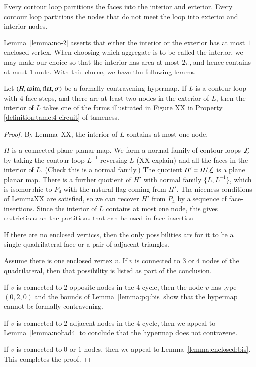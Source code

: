 Every contour loop partitions the faces into the interior and
exterior.  Every contour loop partitions the nodes that do not meet
the loop into exterior and interior nodes.
%

Lemma~\ref{lemma:no-2} asserts that either the interior or the
exterior has at most $1$ enclosed vertex.   When choosing which
aggregate is to be called the interior, we may make our choice so
that the interior has area at most $2\pi$, and hence contains at
most $1$ node. With this choice, we have the following lemma.

\begin{lemma}
Let $(H,{\operatorname{azim}},\operatorname{flat},\sigma)$ be a formally contravening hypermap. If
$L$ is a contour loop with $4$ face steps, and there are at least
two nodes in the exterior of $L$, then the interior of $L$ takes one
of the forms illustrated in Figure XX in Property
    \ref{definition:tame:4-circuit} of tameness.
\end{lemma}

\begin{proof}
By Lemma~XX, the interior of $L$ contains at most one node.

$H$ is a connected plane planar map.  We form a normal family of
contour loops ${\cal L}$ by taking the contour loop $L^{-1}$
reversing $L$ (XX explain) and all the faces in the interior of $L$.
(Check this is a normal family.)  The quotient $H' = H/{\cal L}$ is
a plane planar map.  There is a further quotient of $H'$ with normal
family $\{L,L^{-1}\}$, which is isomorphic to $P_4$ with the natural
flag coming from $H'$.  The niceness conditions of LemmaXX are
satisfied, so we can recover $H'$ from $P_4$ by a sequence of
face-insertions.  Since the interior of $L$ contains at most one
node, this gives restrictions on the partitions that can be used in
face-insertion.

If there are no enclosed vertices, then the only possibilities are
for it to be a single quadrilateral face or a pair of adjacent
triangles.

Assume there is one enclosed vertex $v$.  If $v$ is connected to $3$
or $4$ nodes of the quadrilateral, then that possibility is listed
as part of the conclusion.

If $v$ is connected to $2$ opposite nodes in the $4$-cycle, then the
node $v$ has type $(0,2,0)$ and the bounds of
Lemma~\ref{lemma:pq:bis} show that the hypermap cannot be formally
contravening.

If $v$ is connected to $2$ adjacent nodes in the $4$-cycle, then we
appeal to Lemma~\ref{lemma:nobad4} to conclude that the hypermap
does not contravene.

If $v$ is connected to $0$ or $1$ nodes, then we appeal to
Lemma~\ref{lemma:enclosed:bis}.  This completes the proof.
\end{proof}

